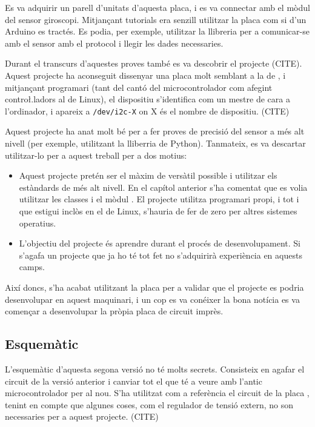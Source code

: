 Es va adquirir un parell d'unitats d'aquesta placa, i es va connectar amb el
mòdul del sensor giroscopi. Mitjançant tutorials era senzill utilitzar la
placa  com si d'un Arduino es tractés. Es podia, per exemple,
utilitzar la llibreria  per a comunicar-se amb el sensor amb el
protocol  i llegir les dades necessaries.

Durant el transcurs d'aquestes proves també es va descobrir el projecte
 (CITE). Aquest projecte ha aconseguit dissenyar una placa
molt semblant a la de , i mitjançant programari (tant del cantó
del microcontrolador com afegint contro\l.ladors al  de Linux),
el dispositiu s'identifica com un mestre  de cara a l'ordinador, i
apareix a \verb|/dev/i2c-X| on X és el nombre de dispositiu. (CITE)

Aquest projecte ha anat molt bé per a fer proves de precisió del sensor a més
alt nivell (per exemple, utilitzant la lliberria  de Python). Tanmateix,
es va descartar utilitzar-lo per a aquest treball per a dos motius:

\begin{itemize}
    \item Aquest projecte pretén ser el màxim de versàtil possible i utilitzar
    els estàndards de més alt nivell. En el capítol anterior s'ha comentat que
    es volia utilitzar les classes  i el mòdul . El projecte
     utilitza programari propi, i tot i que estigui inclòs
    en el  de Linux, s'hauria de fer de zero per altres sistemes
    operatius.
    \item L'objectiu del projecte és aprendre durant el procés de desenvolupament.
    Si s'agafa un projecte que ja ho té tot fet no s'adquirirà experiència en
    aquests camps.
\end{itemize}

Així doncs, s'ha acabat utilitzant la placa  per a validar
que el projecte es podria desenvolupar en aquest maquinari, i un cop es va
conéixer la bona notícia es va començar a desenvolupar la pròpia placa de circuit
imprès.

\subsection{Esquemàtic}

L'esquemàtic d'aquesta segona versió no té molts secrets. Consisteix en agafar
el circuit de la versió anterior i canviar tot el que té a veure amb l'antic
microcontrolador per al nou. S'ha utilitzat com a referència el circuit de la
placa , tenint en compte que algunes coses, com el regulador de
tensió extern, no son necessaries per a aquest projecte. (CITE)

